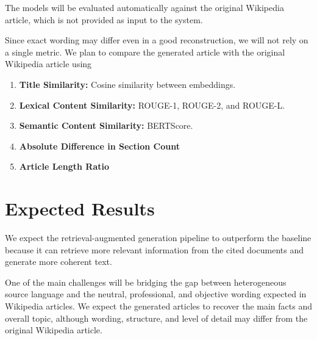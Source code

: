 \documentclass[10pt,a4paper]{article}
\begin{document}
The models will be evaluated automatically against the original Wikipedia article, which is not provided as input to the system.

Since exact wording may differ even in a good reconstruction, we will not rely on a single metric. We plan to compare the generated article with the original Wikipedia article using

\begin{enumerate}
    \item \textbf{Title Similarity:} Cosine similarity between embeddings.
    \item \textbf{Lexical Content Similarity:} ROUGE-1, ROUGE-2, and ROUGE-L.
    \item \textbf{Semantic Content Similarity:} BERTScore.
    \item \textbf{Absolute Difference in Section Count}
    \item \textbf{Article Length Ratio}
\end{enumerate}

\section{Expected Results}

We expect the retrieval-augmented generation pipeline to outperform the baseline because it can retrieve more relevant information from the cited documents and generate more coherent text.

One of the main challenges will be bridging the gap between heterogeneous source language and the neutral, professional, and objective wording expected in Wikipedia articles. We expect the generated articles to recover the main facts and overall topic, although wording, structure, and level of detail may differ from the original Wikipedia article.
\end{document}
